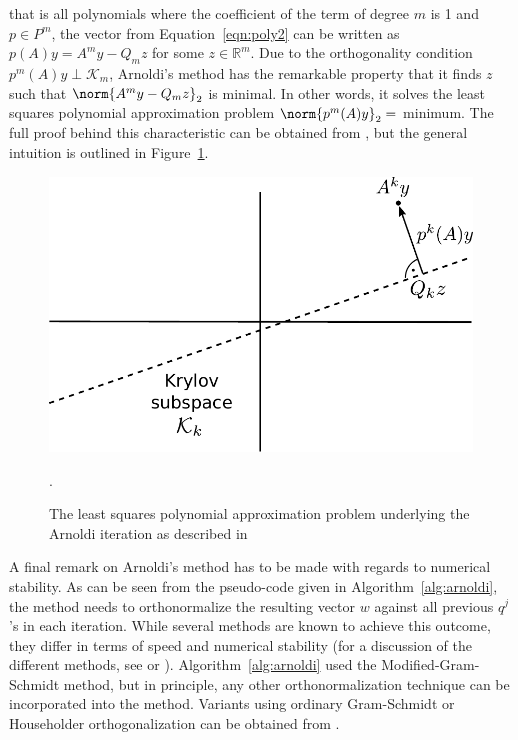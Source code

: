 \noindent that is all polynomials where the coefficient of the term of degree $m$ is 1 and $p \in P^m$, the vector from Equation~\hyperref[eqn:poly2]{\ref{eqn:poly2}} can be written as $p(A)y=A^my-Q_mz$ for some $z \in \mathbb{R}^m$. Due to the orthogonality condition $p^m(A)y \perp \mathcal{K}_m$, Arnoldi's method has the remarkable property that it finds $z$ such that $\norm{A^my-Q_mz}_2$ is minimal. In other words, it solves the least squares polynomial approximation problem $\norm{p^m(A)y}_2 =$ minimum. The full proof behind this characteristic can be obtained from \cite{trefethen_numerical_1997}, but the general intuition is outlined in Figure~\hyperref[fig:arnoldi]{\ref{fig:arnoldi}}.

\begin{figure}[h]
    \centering
    \includegraphics[width=0.6\linewidth]{figures/Arnoldi.pdf}
    \caption{The least squares polynomial approximation problem underlying the Arnoldi iteration as described in \cite{trefethen_numerical_1997}}.
    \label{fig:arnoldi}
\end{figure}

\noindent A final remark on Arnoldi's method has to be made with regards to numerical stability. As can be seen from the pseudo-code given in Algorithm~\hyperref[alg:arnoldi]{\ref{alg:arnoldi}}, the method needs to orthonormalize the resulting vector $w$ against all previous $q^j$'s in each iteration. While several methods are known to achieve this outcome, they differ in terms of speed and numerical stability (for a discussion of the different methods, see \cite{golub_matrix_2013} or \cite{trefethen_numerical_1997}). Algorithm~\hyperref[alg:arnoldi]{\ref{alg:arnoldi}} used the Modified-Gram-Schmidt method, but in principle, any other orthonormalization technique can be incorporated into the method. Variants using ordinary Gram-Schmidt or Householder orthogonalization can be obtained from \cite{saad_iterative_2003}.